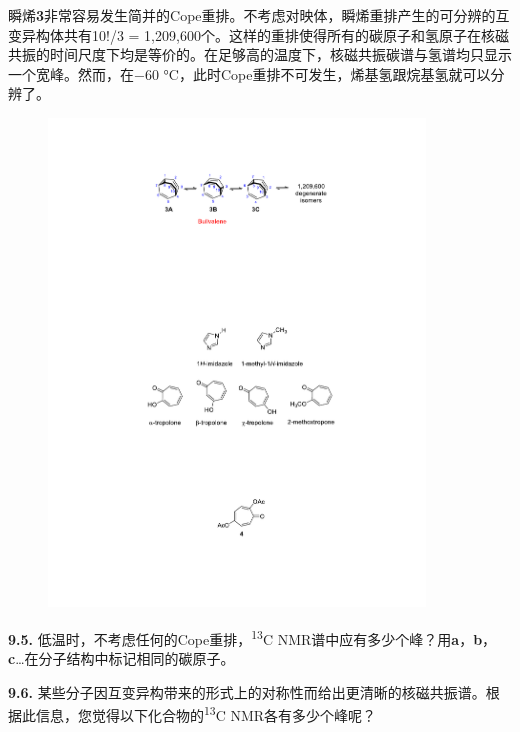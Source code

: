 瞬烯\textbf{3}非常容易发生简并的Cope重排。不考虑对映体，瞬烯重排产生的可分辨的互变异构体共有10!/3 = 1,209,600个。这样的重排使得所有的碳原子和氢原子在核磁共振的时间尺度下均是等价的。在足够高的温度下，核磁共振碳谱与氢谱均只显示一个宽峰。然而，在−60 °C，此时Cope重排不可发生，烯基氢跟烷基氢就可以分辨了。

\begin{figure}[h]
	\centering
	\includegraphics[width=10cm]{./pic/t9-2.pdf}
\end{figure}

\noindent\textbf{9.5.} 低温时，不考虑任何的Cope重排，\textsuperscript{13}C
NMR谱中应有多少个峰？用\textbf{a}，\textbf{b}，\textbf{c}\ldots{}在分子结构中标记相同的碳原子。

\noindent\textbf{9.6.}
某些分子因互变异构带来的形式上的对称性而给出更清晰的核磁共振谱。根据此信息，您觉得以下化合物的\textsuperscript{13}C
NMR各有多少个峰呢？

